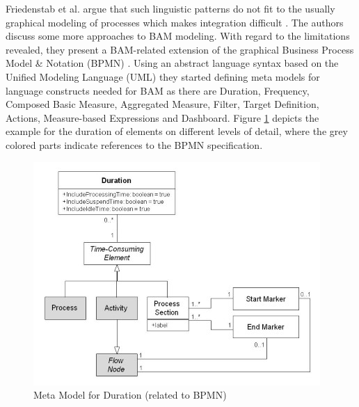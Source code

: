 Friedenstab et al. argue that such linguistic patterns do not fit to the usually graphical modeling of processes which makes integration difficult \cite{article:BPMNActivityMon}. The authors discuss some more approaches to BAM modeling. With regard to the limitations revealed, they present a BAM-related extension of the graphical Business Process Model & Notation (BPMN) \cite{article:BPMNActivityMon}.
Using an abstract language syntax based on the Unified Modeling Language (UML) they started defining meta models for language constructs needed for BAM as there are Duration, Frequency, Composed Basic Measure, Aggregated Measure, Filter, Target Definition, Actions, Measure-based Expressions and Dashboard. Figure \ref{fig:Meta-Model} depicts the example for the duration of elements on different levels of detail, where the grey colored parts indicate references to the BPMN specification.

\begin{figure}[htbp]
	\centering
	\includegraphics[width=0.9\linewidth]{Figures/Chapter5/Monitoring/Meta-Mode-fo-Duration-relate-to-BPMN-1.jpg}
	\caption[Meta Model for Duration (related to BPMN) 12]{Meta Model for Duration (related to BPMN) \cite{article:BPMNActivityMon}}
	\label{fig:Meta-Model}
\end{figure}


